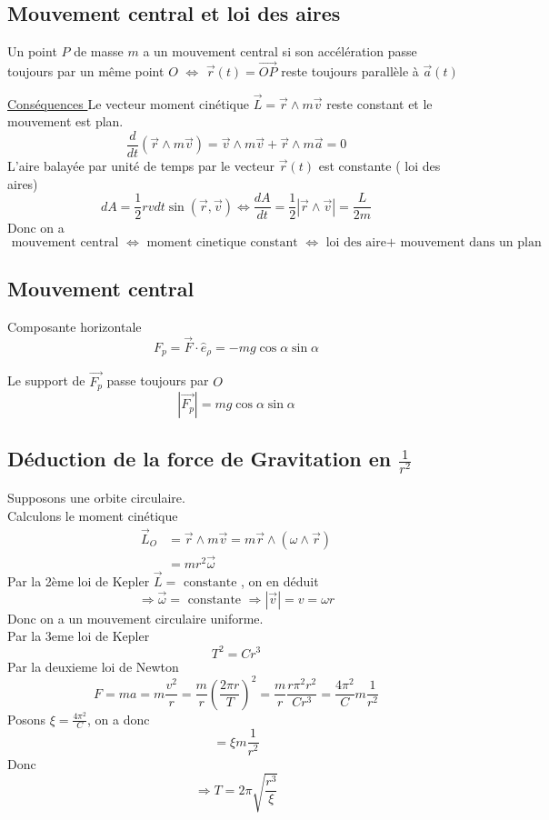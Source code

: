 \documentclass[../main.tex]{subfiles}
\begin{document}
\subsection{Mouvement central et loi des aires}
\begin{defn}
	Un point $P$ de masse $m$ a un mouvement central si son accélération passe toujours par un même point $O$ $\iff$ $\vec{r}( t) = \vec{OP}$ reste toujours parallèle à $\vec{a}( t) $
\end{defn}
\underline{ Conséquences }
Le vecteur moment cinétique $\vec{L}= \vec{r} \land m \vec{v}$ reste constant et le mouvement est plan.
\[ 
	\frac{d}{dt} ( \vec{r} \land m \vec{v}) = \vec{v} \land m \vec{v} + \vec{r} \land m \vec{a} = 0
\]
L'aire balayée par unité de temps par le vecteur $\vec{r}( t) $ est constante ( loi des aires) 
\[ 
	d A = \frac{1}{2} r v dt \sin( \vec{r}, \vec{v}) \iff \frac{dA}{dt} = \frac{1}{2}|\vec{r}\land \vec{v}| = \frac{L}{2m}
\]
Donc on a
\[ 
\text{ mouvement central } \iff \text{ moment cinetique constant } \iff \text{ loi des aire+ mouvement dans un plan } 
\]
\subsection{Mouvement central}
Composante horizontale
\[ 
	F_p = \vec{F} \cdot \hat{e}_{\rho} = - mg \cos\alpha\sin \alpha
\]


Le support de $\vec{F_p}$ passe toujours par $O$ 
\[ 
|\vec{F_p}| = mg \cos \alpha \sin\alpha
\]
\subsection{Déduction de la force de Gravitation en $\frac{1}{r^{2}}$}
Supposons une orbite circulaire.\\
Calculons le moment cinétique
\begin{align*}
	\vec{L}_O &= \vec{r} \land m \vec{v} = m \vec{r} \land ( \omega \land \vec{r}) \\
		  &= m r^{2} \vec{\omega}
\end{align*}
Par la 2ème loi de Kepler
$\vec{L} = \text{ constante } $, on en déduit
\[ 
\Rightarrow  \vec{\omega} = \text{ constante } \Rightarrow |\vec{v}| = v = \omega r
\]
Donc on a un mouvement circulaire uniforme.\\
Par la 3eme loi de Kepler
\[ 
T^{2} = C r^{3}
\]
Par la deuxieme loi de Newton
\[ 
	F= ma = m \frac{v^{2}}{r} = \frac{m}{r} ( \frac{2 \pi r}{T}) ^{2} = \frac{m}{r} \frac{r \pi^{2} r^{2}}{C r^{3}} = \frac{4 \pi^{2}}{C} m \frac{1}{r^{2}}
\]
Posons $\xi = \frac{4\pi^{2}}{C}$, on a donc
\[ 
=\xi m \frac{1}{r^{2}}
\]
Donc
\[ 
	\Rightarrow T = 2 \pi \sqrt{\frac{r^{3}}{\xi}}
\]
\end{document}
